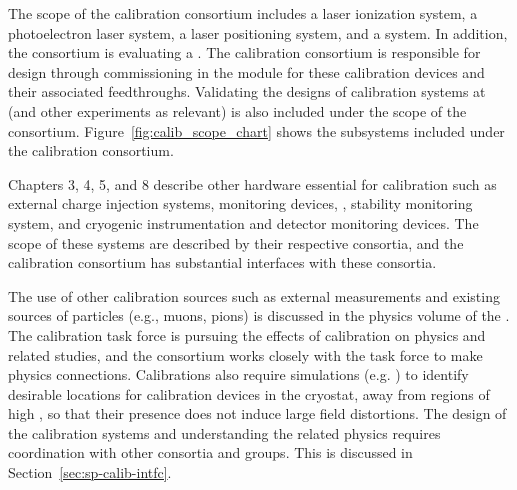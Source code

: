 
The scope of the calibration consortium includes a laser ionization system, a photoelectron laser system, a laser positioning system, and a 
system. In addition, the consortium is evaluating a 
. The calibration consortium is responsible for design through commissioning in the  module for these calibration devices and their associated feedthroughs. Validating the designs of calibration systems at  (and other experiments as relevant) is also included under the scope of the consortium. Figure~\ref{fig:calib_scope_chart} shows the subsystems included under the calibration consortium. 

Chapters 3, 4, 5, and 8 describe other hardware essential for calibration such as  external charge injection systems,  monitoring devices, ,
stability monitoring system, and cryogenic instrumentation and detector monitoring devices. The scope of these systems are described by their respective consortia, and the calibration consortium has substantial interfaces with these consortia. 

The use of other calibration sources such as external measurements and existing sources of particles (e.g., muons, pions) is discussed in the physics volume of the . The calibration task force is pursuing the effects of calibration on physics and related studies, and the consortium works closely with the task force to make physics connections. Calibrations also require simulations (e.g. \efield) to identify desirable locations for calibration devices in the cryostat, away from regions of high \efield, so that their presence does not induce large field distortions. 
The design of the calibration systems and understanding the related physics requires coordination with other consortia and groups. This is discussed in Section~\ref{sec:sp-calib-intfc}.


